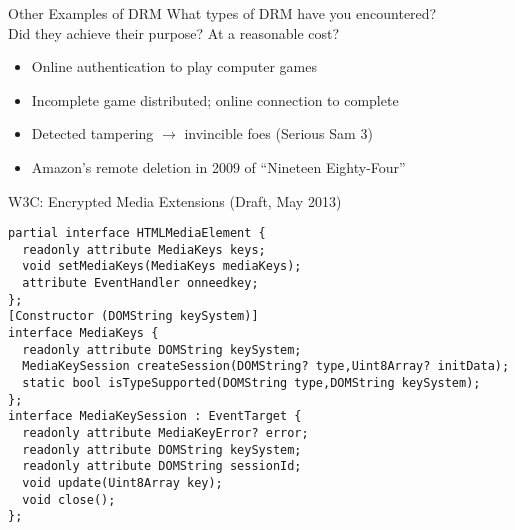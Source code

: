 \documentclass{beamer}
\begin{document}
\begin{frame}{Other Examples of DRM}
What types of DRM have you encountered? \\
\bigskip
Did they achieve their purpose? At a reasonable cost?\\
\bigskip
\pause
\begin{itemize}
\item Online authentication to play computer games
\item Incomplete game distributed; online connection to complete
\item Detected tampering $\rightarrow$ invincible foes (Serious Sam 3)
\item Amazon's remote deletion in 2009 of ``Nineteen Eighty-Four''
\end{itemize}
\end{frame}

\begin{frame}[fragile]{W3C: Encrypted Media Extensions (Draft, May 2013)}
\footnotesize
\begin{lstlisting}
partial interface HTMLMediaElement {
  readonly attribute MediaKeys keys;
  void setMediaKeys(MediaKeys mediaKeys);
  attribute EventHandler onneedkey;
};
[Constructor (DOMString keySystem)]
interface MediaKeys {
  readonly attribute DOMString keySystem;
  MediaKeySession createSession(DOMString? type,Uint8Array? initData);
  static bool isTypeSupported(DOMString type,DOMString keySystem);
};
interface MediaKeySession : EventTarget {
  readonly attribute MediaKeyError? error;
  readonly attribute DOMString keySystem;
  readonly attribute DOMString sessionId;
  void update(Uint8Array key);
  void close();
};
\end{lstlisting}
\end{frame}
\end{document}
